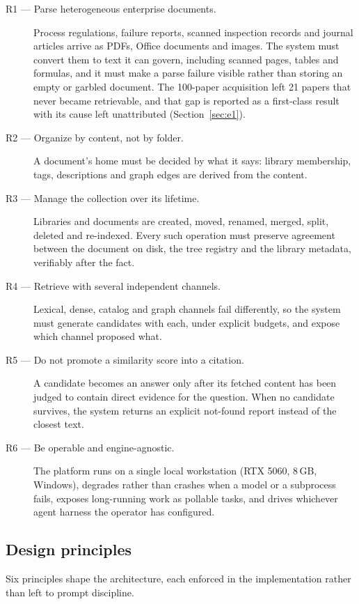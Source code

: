 \begin{description}
\item[R1 --- Parse heterogeneous enterprise documents.] Process regulations,
failure reports, scanned inspection records and journal articles arrive as
PDFs, Office documents and images. The system must convert them to text it
can govern, including scanned pages, tables and formulas, and it must make a
parse failure visible rather than storing an empty or garbled document. The
100-paper acquisition left 21 papers that never became retrievable, and that
gap is reported as a first-class result with its cause left unattributed
(Section~\ref{sec:e1}).
\item[R2 --- Organize by content, not by folder.] A document's home must be
decided by what it says: library membership, tags, descriptions and graph
edges are derived from the content.
\item[R3 --- Manage the collection over its lifetime.] Libraries and
documents are created, moved, renamed, merged, split, deleted and re-indexed.
Every such operation must preserve agreement between the document on disk,
the tree registry and the library metadata, verifiably after the fact.
\item[R4 --- Retrieve with several independent channels.] Lexical, dense,
catalog and graph channels fail differently, so the system must generate
candidates with each, under explicit budgets, and expose which channel
proposed what.
\item[R5 --- Do not promote a similarity score into a citation.] A candidate
becomes an answer only after its fetched content has been judged to contain
direct evidence for the question. When no candidate survives, the system
returns an explicit not-found report instead of the closest text.
\item[R6 --- Be operable and engine-agnostic.] The platform runs on a single
local workstation (RTX 5060, 8\,GB, Windows), degrades rather than crashes
when a model or a subprocess fails, exposes long-running work as pollable
tasks, and drives whichever agent harness the operator has configured.
\end{description}

\subsection{Design principles}
\label{sec:principles}

Six principles shape the architecture, each enforced in the implementation
rather than left to prompt discipline.


